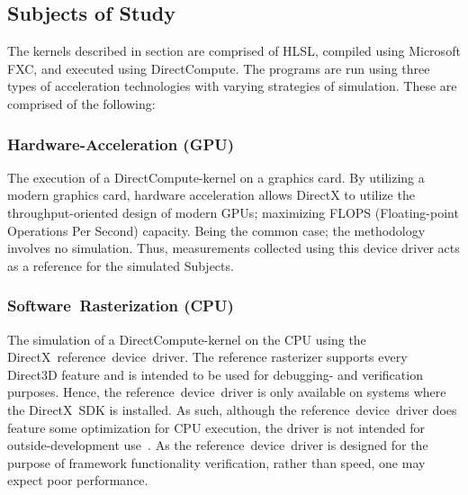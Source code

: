 \subsection{Subjects of Study}
\label{sec:contribution:subjectsofstudy}
The kernels described in section  are comprised of HLSL, compiled using Microsoft FXC, and executed using DirectCompute.
The programs are run using three types of acceleration technologies with varying strategies of simulation.
These are comprised of the following:

\subsubsection{Hardware-Acceleration (GPU)}
The execution of a DirectCompute-kernel on a graphics card.
By utilizing a modern graphics card, hardware acceleration allows DirectX to utilize the throughput-oriented design of modern GPUs; maximizing FLOPS (Floating-point Operations Per Second) capacity.
Being the common case; the methodology involves no simulation.
Thus, measurements collected using this device driver acts as a reference for the simulated Subjects.

\subsubsection{Software~Rasterization (CPU)}
The simulation of a DirectCompute-kernel on the CPU using the DirectX~reference~device~driver.
The reference rasterizer supports every Direct3D feature and is intended to be used for debugging- and verification purposes.
Hence, the reference~device~driver is only available on systems where the DirectX~SDK is installed.
As such, although the reference~device~driver does feature some optimization for CPU execution, the driver is not intended for outside-development use~.
As the reference~device~driver is designed for the purpose of framework functionality verification, rather than speed, one may expect poor performance.

